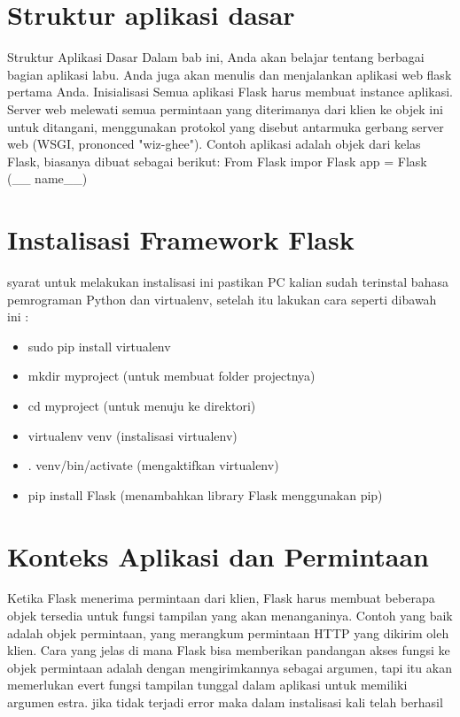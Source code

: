 \section{Struktur aplikasi dasar}
Struktur Aplikasi Dasar 
Dalam bab ini, Anda akan belajar tentang berbagai bagian aplikasi labu. Anda juga akan menulis dan menjalankan aplikasi web flask pertama Anda. 
Inisialisasi 
Semua aplikasi Flask harus membuat instance aplikasi. Server web melewati semua permintaan yang diterimanya dari klien ke objek ini untuk ditangani, menggunakan protokol yang disebut antarmuka gerbang server web (WSGI, prononced "wiz-ghee"). Contoh aplikasi adalah objek dari kelas Flask, biasanya dibuat sebagai berikut: 
From Flask impor Flask 
app = Flask (__ name__)

\section{Instalisasi Framework Flask}
syarat untuk melakukan instalisasi ini pastikan PC kalian sudah terinstal bahasa pemrograman Python dan virtualenv, setelah
itu lakukan cara seperti dibawah ini :
\begin{itemize}
\item sudo pip install virtualenv 
\item mkdir myproject (untuk membuat folder projectnya)
\item cd myproject (untuk menuju ke direktori)
\item virtualenv venv (instalisasi virtualenv)
\item . venv/bin/activate (mengaktifkan virtualenv)
\item pip install Flask (menambahkan library Flask menggunakan pip)
\end{itemize}

\section{Konteks Aplikasi dan Permintaan}
Ketika Flask menerima permintaan dari klien, Flask harus membuat beberapa objek tersedia untuk fungsi tampilan yang akan menanganinya. Contoh yang baik adalah objek permintaan, yang merangkum permintaan HTTP yang dikirim oleh klien. Cara yang jelas di mana Flask bisa memberikan pandangan akses fungsi ke objek permintaan adalah dengan mengirimkannya sebagai argumen, tapi itu akan memerlukan evert fungsi tampilan tunggal dalam aplikasi untuk memiliki argumen estra.
jika tidak terjadi error maka dalam instalisasi kali telah berhasil




